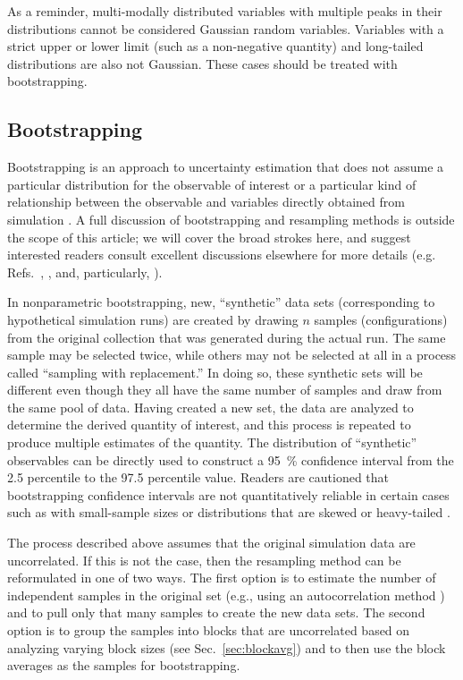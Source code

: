 As a reminder, multi-modally distributed variables with multiple peaks in their distributions cannot be considered Gaussian random variables.  Variables with a strict upper or lower limit (such as a non-negative quantity) and long-tailed distributions are also not Gaussian.  These cases should be treated with bootstrapping.

\subsection{Bootstrapping}\label{sec:bootstrap}

Bootstrapping is an approach to uncertainty estimation that does not assume a particular distribution for the observable of interest or a particular kind of relationship between the observable and variables directly obtained from simulation \cite{Tibshirani1998}.  A full discussion of bootstrapping and resampling methods is outside the scope of this article; we will cover the broad strokes here, and suggest interested readers consult excellent discussions elsewhere for more details (e.g. Refs.~\cite{Schenker1985}, \cite{Chernick2009}, and, particularly, \cite{Tibshirani1998}).

In nonparametric bootstrapping, new, ``synthetic'' data sets (corresponding to hypothetical simulation runs) are created by drawing $n$ samples (configurations) from the original collection that was generated during the actual run.  The same sample may be selected twice, while others may not be selected at all in a process called ``sampling with replacement.''  In doing so, these synthetic sets will be different even though they all have the same number of samples and draw from the same pool of data.  Having created a new set, the data are analyzed to determine the derived quantity of interest, and this process is repeated to produce multiple estimates of the quantity.  The distribution of ``synthetic'' observables can be directly used to construct a 95~\% confidence interval from the 2.5 percentile to the 97.5 percentile value.
Readers are cautioned that bootstrapping confidence intervals are not quantitatively reliable in certain cases such as with small-sample sizes or distributions that are skewed or heavy-tailed \cite{Schenker1985,Chernick2009}.

The process described above assumes that the original simulation data are uncorrelated.  If this is not the case, then the resampling method can be reformulated in one of two ways.  The first option is to estimate the number of independent samples in the original set (e.g., using an autocorrelation method \cite{Chodera-2016,Lyman2007a}) and to pull only that many samples to create the new data sets.  The second option is to group the samples into blocks that are uncorrelated based on analyzing varying block sizes (see Sec.~\ref{sec:blockavg}) and to then use the block averages as the samples for bootstrapping.

